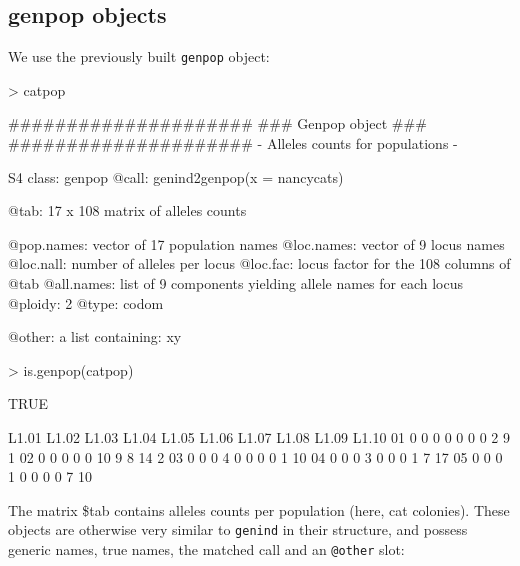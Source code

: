 \documentclass{article}
\begin{document}
\subsection{genpop objects}
We use the previously built \texttt{genpop} object:
\begin{Schunk}
\begin{Sinput}
> catpop
\end{Sinput}
\begin{Soutput}
       #####################
       ### Genpop object ### 
       #####################
- Alleles counts for populations - 

S4 class:  genpop
@call: genind2genpop(x = nancycats)

@tab:  17 x 108 matrix of alleles counts

@pop.names: vector of  17 population names
@loc.names: vector of  9 locus names
@loc.nall: number of alleles per locus
@loc.fac: locus factor for the  108 columns of @tab
@all.names: list of  9 components yielding allele names for each locus
@ploidy:  2
@type:  codom

@other: a list containing: xy 
\end{Soutput}
\begin{Sinput}
> is.genpop(catpop)
\end{Sinput}
\begin{Soutput}
[1] TRUE
\end{Soutput}
\begin{Soutput}
   L1.01 L1.02 L1.03 L1.04 L1.05 L1.06 L1.07 L1.08 L1.09 L1.10
01     0     0     0     0     0     0     0     2     9     1
02     0     0     0     0     0    10     9     8    14     2
03     0     0     0     4     0     0     0     0     1    10
04     0     0     0     3     0     0     0     1     7    17
05     0     0     0     1     0     0     0     0     7    10
\end{Soutput}
\end{Schunk}
The matrix \$tab contains alleles counts per population (here, cat colonies).
These objects are otherwise very similar to \texttt{genind} in their
structure, and possess generic names, true names, the matched call and
an \texttt{@other} slot:
\end{document}
